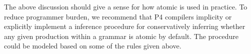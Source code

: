 The above discussion should give a sense for how atomic is used in practice. To
reduce programmer burden, we recommend that P4 compilers implicity or
explicitly implement a inference procedure for conservatively inferring whether
any given production within a grammar is atomic by default. The procedure could
be modeled based on some of the rules given above.
